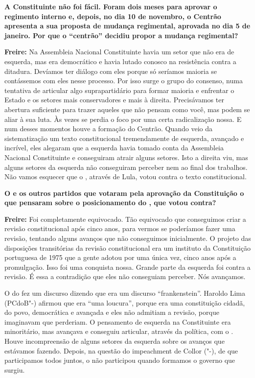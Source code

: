\textbf{A Constituinte não foi fácil. Foram dois meses para aprovar o
regimento interno e, depois, no dia 10 de novembro, o Centrão apresenta
a sua proposta de mudança regimental, aprovada no dia 5 de janeiro. Por
que o ``centrão'' decidiu propor a mudança regimental?}

\textbf{Freire:} Na Assembleia Nacional Constituinte havia um setor que
não era de esquerda, mas era democrático e havia lutado conosco na
resistência contra a ditadura. Devíamos ter diálogo com eles porque só
seríamos maioria se contássemos com eles nesse processo. Por isso surge
o grupo do consenso, numa tentativa de articular algo suprapartidário
para formar maioria e enfrentar o Estado e os setores mais conservadores
e mais à direita. Precisávamos ter abertura suficiente para trazer
aqueles que não pensam como você, mas podem se aliar à sua luta. Às
vezes se perdia o foco por uma certa radicalização nossa. E num desses
momentos houve a formação do Centrão. Quando veio da sistematização um
texto constitucional tremendamente de esquerda, avançado e incrível,
eles alegaram que a esquerda havia tomado conta da Assembleia Nacional
Constituinte e conseguiram atrair alguns setores. Isto a direita viu,
mas alguns setores da esquerda não conseguiram perceber nem ao final dos
trabalhos. Não vamos esquecer que o , através de Lula, votou contra o
texto constitucional.

\textbf{O  e os outros partidos que votaram pela aprovação da
Constituição o que pensaram sobre o posicionamento do , que votou
contra?}

\textbf{Freire:} Foi completamente equivocado. Tão equivocado que
conseguimos criar a revisão constitucional após cinco anos, para vermos
se poderíamos fazer uma revisão, tentando alguns avanços que não
conseguimos inicialmente. O projeto das disposições transitórias da
revisão constitucional era um instituto da Constituição portuguesa de
1975 que a gente adotou por uma única vez, cinco anos após a
promulgação. Isso foi uma conquista nossa. Grande parte da esquerda foi
contra a revisão. É essa a contradição que eles não conseguiam perceber.
Nós avançamos.

O do fez um discurso dizendo que era um discurso ``frankenstein''.
Haroldo Lima (PCdoB"-) afirmou que era ``uma loucura'', porque era uma
constituição cidadã, do povo, democrática e avançada e eles não admitiam
a revisão, porque imaginavam que perderiam. O pensamento de esquerda na
Constituinte era minoritário, mas avançava e conseguiu articular,
através da política, com o . Houve incompreensão de alguns setores
da esquerda sobre os avanços que estávamos fazendo. Depois, na questão
do impeachment de Collor ("-), de que participamos todos juntos, o
 não participou quando formamos o governo que surgiu.

